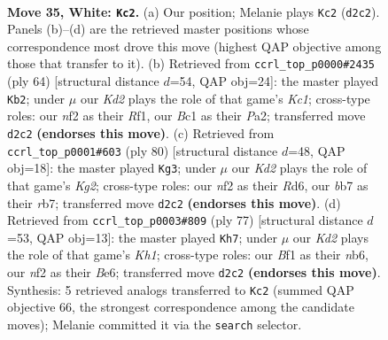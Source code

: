 \documentclass[11pt]{article}
\begin{document}
\clearpage

\begin{figure}[p]\centering
\begin{subfigure}{0.46\textwidth}\centering
\resizebox{\linewidth}{!}{%
\newchessgame
\chessboard[
  setfen={r2r4/pb1p1pk1/8/4R3/6P1/8/PP1K1n2/2B2BR1 w - - 2 35},
  showmover=false,
  pgfstyle=straightmove, color=movearrow, markmove={d2-c2}
]}
\caption{}
\end{subfigure}\hfill
\begin{subfigure}{0.46\textwidth}\centering
\resizebox{\linewidth}{!}{%
\newchessgame
\chessboard[
  setfen={2B5/p3r1pk/5n2/2R5/1P4p1/8/P1P1r3/2K2R2 w - - 8 33},
  showmover=false,
  pgfstyle=straightmove, color=movearrow, markmove={c1-b2}
]}
\caption{}
\end{subfigure}
\\[4pt]
\begin{subfigure}{0.46\textwidth}\centering
\resizebox{\linewidth}{!}{%
\newchessgame
\chessboard[
  setfen={4b3/1r2r1kp/3R2p1/8/4P2P/R4B2/6K1/8 w - - 7 41},
  showmover=false,
  pgfstyle=straightmove, color=movearrow, markmove={g2-g3}
]}
\caption{}
\end{subfigure}\hfill
\begin{subfigure}{0.46\textwidth}\centering
\resizebox{\linewidth}{!}{%
\newchessgame
\chessboard[
  setfen={7k/6p1/1N2b2p/4r3/5r2/P6P/2RR2PK/8 b - - 3 39},
  showmover=false,
  pgfstyle=straightmove, color=movearrow, markmove={h8-h7}
]}
\caption{}
\end{subfigure}
\caption{\textbf{Move 35, White: \texttt{Kc2}.} (a) Our position; Melanie plays \texttt{Kc2} (\texttt{d2c2}). Panels (b)--(d) are the retrieved master positions whose correspondence most drove this move (highest QAP objective among those that transfer to it). (b) Retrieved from \texttt{ccrl\_top\_p0000\#2435} (ply 64) [structural distance $d$=54, QAP obj=24]: the master played \texttt{Kb2}; under $\mu$ our \emph{Kd2} plays the role of that game's \emph{Kc1}; cross-type roles: our \emph{n}f2 as their \emph{R}f1, our \emph{B}c1 as their \emph{P}a2; transferred move \texttt{d2c2} \textbf{(endorses this move)}. (c) Retrieved from \texttt{ccrl\_top\_p0001\#603} (ply 80) [structural distance $d$=48, QAP obj=18]: the master played \texttt{Kg3}; under $\mu$ our \emph{Kd2} plays the role of that game's \emph{Kg2}; cross-type roles: our \emph{n}f2 as their \emph{R}d6, our \emph{b}b7 as their \emph{r}b7; transferred move \texttt{d2c2} \textbf{(endorses this move)}. (d) Retrieved from \texttt{ccrl\_top\_p0003\#809} (ply 77) [structural distance $d$=53, QAP obj=13]: the master played \texttt{Kh7}; under $\mu$ our \emph{Kd2} plays the role of that game's \emph{Kh1}; cross-type roles: our \emph{B}f1 as their \emph{n}b6, our \emph{n}f2 as their \emph{B}e6; transferred move \texttt{d2c2} \textbf{(endorses this move)}. Synthesis: 5 retrieved analogs transferred to \texttt{Kc2} (summed QAP objective 66, the strongest correspondence among the candidate moves); Melanie committed it via the \texttt{search} selector.}
\label{fig:thought-m68}
\end{figure}
\end{document}
